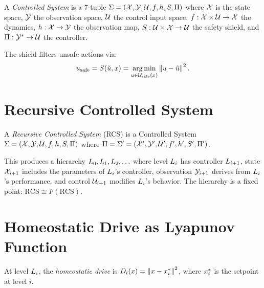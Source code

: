\documentclass[conference]{IEEEtran}
\begin{document}
\begin{definition}
\label{def:cs}
A \emph{Controlled System} is a 7-tuple
$\Sigma = (\mathcal{X}, \mathcal{Y}, \mathcal{U}, f, h, S, \Pi)$
where $\mathcal{X}$ is the state space, $\mathcal{Y}$ the observation space, $\mathcal{U}$ the
control input space, $f : \mathcal{X} \times \mathcal{U} \to \mathcal{X}$ the dynamics,
$h : \mathcal{X} \to \mathcal{Y}$ the observation map, $S : \mathcal{U} \times \mathcal{X} \to \mathcal{U}$
the safety shield, and $\Pi : \mathcal{Y}^* \to \mathcal{U}$ the controller.

The shield filters unsafe actions via:
\begin{equation}
  u_{\text{safe}} = S(\tilde{u}, x)
  = \operatorname*{arg\,min}_{u \in \mathcal{U}_{\text{safe}}(x)} \left\| u - \tilde{u} \right\|^2.
\end{equation}
\end{definition}

\section{Recursive Controlled System}
\label{sec:rcs}

\begin{definition}
\label{def:rcs}
A \emph{Recursive Controlled System} (RCS) is a Controlled System
$\Sigma = (\mathcal{X}, \mathcal{Y}, \mathcal{U}, f, h, S, \Pi)$ where
$\Pi = \Sigma' = (\mathcal{X}', \mathcal{Y}', \mathcal{U}', f', h', S', \Pi')$.

This produces a hierarchy $L_{0}, L_{1}, L_{2}, \ldots$ where level
$L_{i}$ has controller $L_{i+1}$, state $\mathcal{X}_{i+1}$ includes the
parameters of $L_{i}$'s controller, observation $\mathcal{Y}_{i+1}$ derives from
$L_{i}$'s performance, and control $\mathcal{U}_{i+1}$ modifies $L_{i}$'s behavior.
The hierarchy is a fixed point: $\text{RCS} \cong F(\text{RCS})$.
\end{definition}

\section{Homeostatic Drive as Lyapunov Function}
\label{sec:drive}

\begin{definition}
\label{def:drive}
At level $L_{i}$, the \emph{homeostatic drive} is
$D_{i}(x) = \left\| x - x^*_{i} \right\|^2$,
where $x^*_{i}$ is the setpoint at level $i$.
\end{definition}
\end{document}
